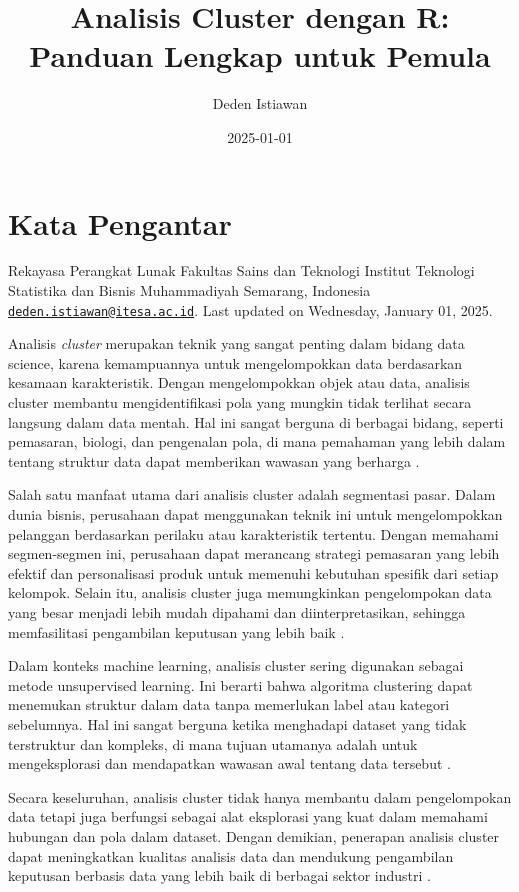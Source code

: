 \documentclass[
  oneside]{book}
\title{Analisis Cluster dengan R: Panduan Lengkap untuk Pemula}
\author{Deden Istiawan}
\date{2025-01-01}
\begin{document}
\maketitle

{
\setcounter{tocdepth}{1}
\tableofcontents
}
\chapter*{Kata Pengantar}\label{kata-pengantar}

Rekayasa Perangkat Lunak
Fakultas Sains dan Teknologi Institut Teknologi Statistika dan
Bisnis Muhammadiyah Semarang, Indonesia
\href{mailto:deden.istiawan@itesa.ac.id}{\nolinkurl{deden.istiawan@itesa.ac.id}}.
Last updated on Wednesday, January 01, 2025.

Analisis \emph{cluster} merupakan teknik yang sangat penting dalam bidang data
science, karena kemampuannya untuk mengelompokkan data berdasarkan
kesamaan karakteristik. Dengan mengelompokkan objek atau data, analisis
cluster membantu mengidentifikasi pola yang mungkin tidak terlihat
secara langsung dalam data mentah. Hal ini sangat berguna di berbagai
bidang, seperti pemasaran, biologi, dan pengenalan pola, di mana
pemahaman yang lebih dalam tentang struktur data dapat memberikan
wawasan yang berharga \citep{kaufman:clustering1990}.

Salah satu manfaat utama dari analisis cluster adalah segmentasi pasar.
Dalam dunia bisnis, perusahaan dapat menggunakan teknik ini untuk
mengelompokkan pelanggan berdasarkan perilaku atau karakteristik
tertentu. Dengan memahami segmen-segmen ini, perusahaan dapat merancang
strategi pemasaran yang lebih efektif dan personalisasi produk untuk
memenuhi kebutuhan spesifik dari setiap kelompok. Selain itu, analisis
cluster juga memungkinkan pengelompokan data yang besar menjadi lebih
mudah dipahami dan diinterpretasikan, sehingga memfasilitasi pengambilan
keputusan yang lebih baik \citep{han2012mining}.

Dalam konteks machine learning, analisis cluster sering digunakan
sebagai metode unsupervised learning. Ini berarti bahwa algoritma
clustering dapat menemukan struktur dalam data tanpa memerlukan label
atau kategori sebelumnya. Hal ini sangat berguna ketika menghadapi
dataset yang tidak terstruktur dan kompleks, di mana tujuan utamanya
adalah untuk mengeksplorasi dan mendapatkan wawasan awal tentang data
tersebut \citep{jain2010}.

Secara keseluruhan, analisis cluster tidak hanya membantu dalam
pengelompokan data tetapi juga berfungsi sebagai alat eksplorasi yang
kuat dalam memahami hubungan dan pola dalam dataset. Dengan demikian,
penerapan analisis cluster dapat meningkatkan kualitas analisis data dan
mendukung pengambilan keputusan berbasis data yang lebih baik di
berbagai sektor industri .
\end{document}
